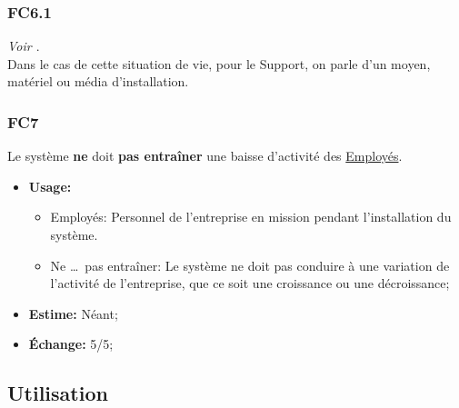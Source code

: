 \documentclass{article}
\begin{document}
\subsubsection{FC6.1}
\textit{Voir \hyperref[cat:fc6]{}}.
\medskip\\
Dans le cas de cette situation de vie, pour le Support, on parle d'un moyen,
matériel ou média d'installation.

\subsubsection{FC7}\label{cat:fc7}
Le système \textbf{ne} doit \textbf{pas entraîner} une baisse d'activité des
\uline{Employés}.
\begin{itemize}
	\item \textbf{Usage:} \begin{itemize}
		\item Employés: Personnel de l'entreprise en mission pendant
			  l'installation du système.
		\item Ne \dots\ pas entraîner: Le système ne doit pas conduire à
			  une variation de l'activité de l'entreprise, que ce soit une
			  croissance ou une décroissance;
	\end{itemize}
	\item \textbf{Estime:} Néant;
	\item \textbf{Échange:} 5/5;
\end{itemize}

\newpage
\subsection{Utilisation}
\end{document}
